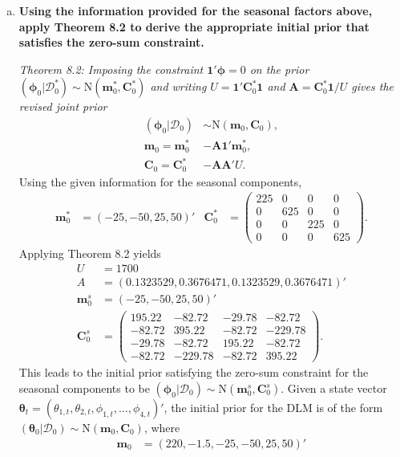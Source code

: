 \documentclass{article}
\newcommand{\bone}{\mathbf{1}}
\newcommand{\bphi}{\boldsymbol{\phi}}
\newcommand{\sD}{\mathcal{D}}
\newcommand{\bm}{\mathbf{m}}
\newcommand{\bC}{\mathbf{C}}
\newcommand{\bA}{\mathbf{A}}
\newcommand{\btheta}{\boldsymbol{\theta}}
\begin{document}
	\begin{enumerate}[(a)]
		\item \textbf{Using the information provided for the seasonal factors above, apply Theorem 8.2 to derive the appropriate initial prior that satisfies the zero-sum constraint.}
		
		\textit{Theorem 8.2: Imposing the constraint $\bone'\bphi = 0$ on the prior $(\bphi_0|\sD_0^*) \sim \text{N}(\bm_0^*,\bC_0^*)$ and writing $U = \bone'\bC_0^*\bone$ and $\bA = \bC_0^*\bone/U$ gives the revised joint prior}
		\begin{align*}
			(\bphi_0|\sD_0) & \sim \text{N}(\bm_0,\bC_0),\\
			\bm_0 = \bm_0^* & - \bA\bone'\bm_0^*,\\
			\bC_0 = \bC_0^* & - \bA\bA'U.
		\end{align*} 
		Using the given information for the seasonal components,
		\begin{align*}
			\bm_0^* & = (-25,-50,25,50)' &
			\bC_0^* & = \begin{pmatrix}
				225 & 0 & 0 & 0 \\
				0 & 625 & 0 & 0 \\
				0 & 0 & 225 & 0 \\
				0 & 0 & 0 & 625
			\end{pmatrix}.
		\end{align*}
		Applying Theorem 8.2 yields
		\begin{align*}
			U & = 1700 \\ A & = (0.1323529, 0.3676471, 0.1323529, 0.3676471)' \\
			\bm_0^s & = (-25,-50,25,50)' \\
			\bC_0^s & = \begin{pmatrix}
			195.22 & -82.72 & -29.78 & -82.72 \\ 
			-82.72 & 395.22 & -82.72 & -229.78 \\ 
			-29.78 & -82.72 & 195.22 & -82.72 \\ 
			-82.72 & -229.78 & -82.72 & 395.22 
			\end{pmatrix}.
		\end{align*}
		This leads to the initial prior satisfying the zero-sum constraint for the seasonal components to be $(\bphi_0|\sD_0) \sim \text{N}(\bm_0^s,\bC_0^s)$. Given a state vector $\btheta_t = (\theta_{1,t},\theta_{2,t},\phi_{1,t},\ldots,\phi_{4,t})'$, the initial prior for the DLM is of the form $(\btheta_0|\sD_0) \sim \text{N}(\bm_0,\bC_0)$, where
		\begin{align*}
			\bm_0 & = (220,-1.5, -25, -50,  25,  50)' \\

\end{align*}
\end{enumerate}
\end{document}
